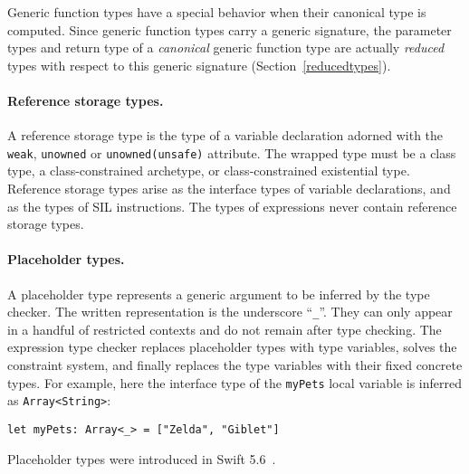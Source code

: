 \documentclass[../generics]{subfiles}
\begin{document}
Generic function types have a special behavior when their canonical type is computed. Since generic function types carry a generic signature, the parameter types and return type of a \emph{canonical} generic function type are actually \emph{reduced} types with respect to this generic signature (Section~\ref{reducedtypes}).

\paragraph{Reference storage types.}
A reference storage type is the type of a variable declaration adorned with the \texttt{weak}, \texttt{unowned} or \texttt{unowned(unsafe)} attribute. The wrapped type must be a class type, a class-constrained archetype, or class-constrained existential type. Reference storage types arise as the interface types of variable declarations, and as the types of SIL instructions. The types of expressions never contain reference storage types.

\paragraph{Placeholder types.}
A placeholder type represents a generic argument to be inferred by the type checker. The written representation is the underscore ``\texttt{\_}''. They can only appear in a handful of restricted contexts and do not remain after type checking. The expression type checker replaces placeholder types with type variables, solves the constraint system, and finally replaces the type variables with their fixed concrete types. For example, here the interface type of the \texttt{myPets} local variable is inferred as \texttt{Array<String>}:
\begin{Verbatim}
let myPets: Array<_> = ["Zelda", "Giblet"]
\end{Verbatim}
Placeholder types were introduced in Swift 5.6~\cite{se0315}.
\end{document}
